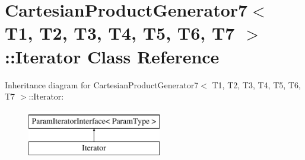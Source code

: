 \hypertarget{classtesting_1_1internal_1_1CartesianProductGenerator7_1_1Iterator}{\section{\-Cartesian\-Product\-Generator7$<$ \-T1, \-T2, \-T3, \-T4, \-T5, \-T6, \-T7 $>$\-:\-:\-Iterator \-Class \-Reference}
\label{db/d7d/classtesting_1_1internal_1_1CartesianProductGenerator7_1_1Iterator}
}
\-Inheritance diagram for \-Cartesian\-Product\-Generator7$<$ \-T1, \-T2, \-T3, \-T4, \-T5, \-T6, \-T7 $>$\-:\-:\-Iterator\-:\begin{figure}[H]
\begin{center}
\leavevmode
\includegraphics[height=2.000000cm]{db/d7d/classtesting_1_1internal_1_1CartesianProductGenerator7_1_1Iterator}
\end{center}
\end{figure}
